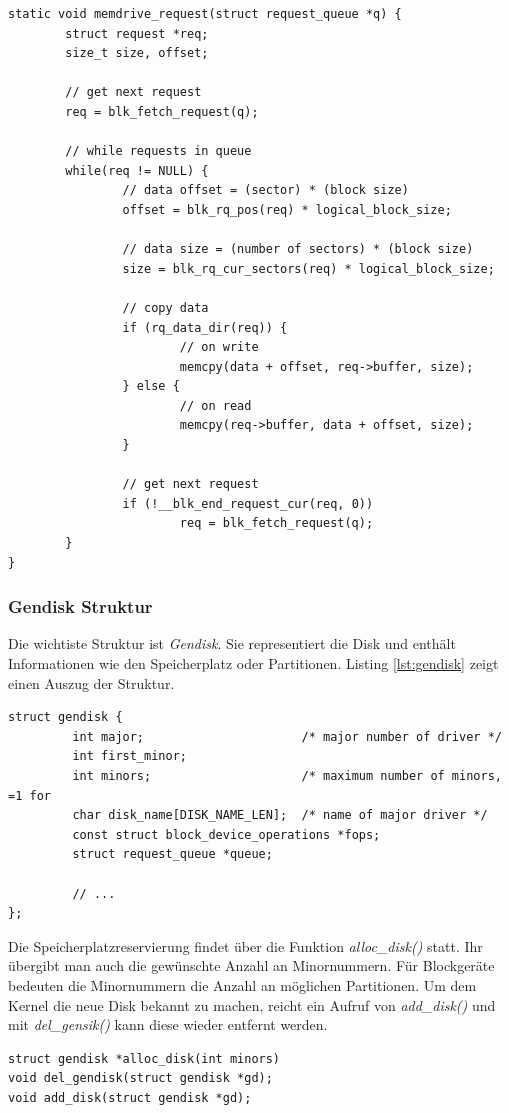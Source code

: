 \begin{lstlisting}[label=lst:blk_rq_handler,caption=Request Queue - Handler-Funktion]
static void memdrive_request(struct request_queue *q) {
        struct request *req;
        size_t size, offset;

        // get next request
        req = blk_fetch_request(q);

        // while requests in queue
        while(req != NULL) {
                // data offset = (sector) * (block size)
                offset = blk_rq_pos(req) * logical_block_size;

                // data size = (number of sectors) * (block size)
                size = blk_rq_cur_sectors(req) * logical_block_size;

                // copy data
                if (rq_data_dir(req)) {
                        // on write
                        memcpy(data + offset, req->buffer, size);
                } else {
                        // on read
                        memcpy(req->buffer, data + offset, size);
                }

                // get next request
                if (!__blk_end_request_cur(req, 0))
                        req = blk_fetch_request(q);
        }
}
\end{lstlisting}

\subsubsection{Gendisk Struktur}

Die wichtiste Struktur ist \emph{Gendisk}. Sie representiert die Disk und enthält Informationen wie den Speicherplatz oder Partitionen. Listing \ref{lst:gendisk} zeigt einen
Auszug der Struktur.
\begin{lstlisting}[label=lst:gendisk,caption=include/linux/genhd.h]
struct gendisk {
         int major;                      /* major number of driver */
         int first_minor;
         int minors;                     /* maximum number of minors, =1 for
         char disk_name[DISK_NAME_LEN];  /* name of major driver */
         const struct block_device_operations *fops;
         struct request_queue *queue;

         // ...
};
\end{lstlisting} \hfill

Die Speicherplatzreservierung findet über die Funktion \emph{alloc\_disk()} statt. Ihr übergibt man auch die gewünschte Anzahl an Minornummern. Für Blockgeräte bedeuten die Minornummern
die Anzahl an möglichen Partitionen. Um dem Kernel die neue Disk bekannt zu machen, reicht ein Aufruf von \emph{add\_disk()} und mit \emph{del\_gensik()} kann diese wieder entfernt werden.
\begin{lstlisting}[caption=Gendisk Funktionen]
struct gendisk *alloc_disk(int minors)
void del_gendisk(struct gendisk *gd);
void add_disk(struct gendisk *gd);
\end{lstlisting}

